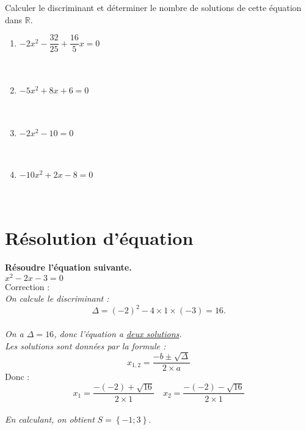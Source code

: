 \documentclass[11pt]{article}
\begin{document}
\begin{exercice}
Calculer le discriminant et déterminer le nombre de solutions de cette
équation dans $\mathbb{R}$.
\begin{multicols}{2}
  \begin{enumerate}
  \item $-2x^2-\dfrac{32}{25}+\dfrac{16}{5}x=0$ \\ \dtf \\ \dtf \\ \dtf 
  \item $-5x^2+8x+6=0$ \\ \dtf \\ \dtf \\ \dtf 
  \item $-2x^2-10=0$ \\ \dtf \\ \dtf \\ \dtf 
  \item $-10x^2+2x-8=0$ \\ \dtf \\ \dtf \\ \dtf 
  \end{enumerate}
\end{multicols}
\end{exercice}

\newpage

\section{Résolution d'équation}

\begin{exercice}
\textbf{Résoudre l'équation suivante.}\\
 $x^2-2x-3=0$ \\
Correction :\\
\textit{On calcule le discriminant :} \\
\[\Delta=\left(-2\right)^2-4\times1\times\left(-3\right)=16.\] \\
\textit{On a $\Delta=16$, donc l'équation a \underline{deux solutions}. \\
Les solutions sont données par la formule :
}\[x_{1,2}=\dfrac{-b \pm \sqrt{\Delta}}{2\times a}\]
Donc :
\[x_{1}=\dfrac{-\left(-2\right)+\sqrt{16}}{2\times1} \quad
x_{2}=\dfrac{-\left(-2\right)-\sqrt{16}}{2\times1}\]\\
\textit{En calculant, on obtient} ${S = \left\{-1;3\right\}}$.
\end{exercice}
\end{document}
